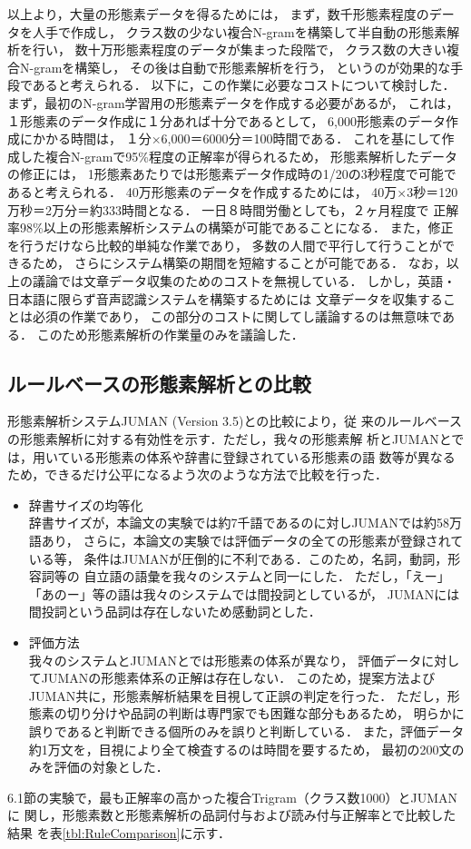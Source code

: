 以上より，大量の形態素データを得るためには，
まず，数千形態素程度のデータを人手で作成し，
クラス数の少ない複合N-gramを構築して半自動の形態素解析を行い，
数十万形態素程度のデータが集まった段階で，
クラス数の大きい複合N-gramを構築し，
その後は自動で形態素解析を行う，
というのが効果的な手段であると考えられる．
以下に，この作業に必要なコストについて検討した．
まず，最初のN-gram学習用の形態素データを作成する必要があるが，
これは，１形態素のデータ作成に１分あれば十分であるとして，
6,000形態素のデータ作成にかかる時間は，
１分×6,000＝6000分＝100時間である．
これを基にして作成した複合N-gramで95\%程度の正解率が得られるため，
形態素解析したデータの修正には，
1形態素あたりでは形態素データ作成時の1/20の3秒程度で可能であると考えられる．
40万形態素のデータを作成するためには，
40万×3秒＝120万秒＝2万分＝約333時間となる．
一日８時間労働としても，２ヶ月程度で
正解率98\%以上の形態素解析システムの構築が可能であることになる．
また，修正を行うだけなら比較的単純な作業であり，
多数の人間で平行して行うことができるため，
さらにシステム構築の期間を短縮することが可能である．
なお，以上の議論では文章データ収集のためのコストを無視している．
しかし，英語・日本語に限らず音声認識システムを構築するためには
文章データを収集することは必須の作業であり，
この部分のコストに関してし議論するのは無意味である．
このため形態素解析の作業量のみを議論した．



\subsection{ルールベースの形態素解析との比較}

形態素解析システムJUMAN \cite{Kurohashi} (Version 3.5)との比較により，従
来のルールベースの形態素解析に対する有効性を示す．ただし，我々の形態素解
析とJUMANとでは，用いている形態素の体系や辞書に登録されている形態素の語
数等が異なるため，できるだけ公平になるよう次のような方法で比較を行った．

\begin{itemize}
\item 辞書サイズの均等化 \\
辞書サイズが，本論文の実験では約7千語であるのに対しJUMANでは約58万語あり，
さらに，本論文の実験では評価データの全ての形態素が登録されている等，
条件はJUMANが圧倒的に不利である．このため，名詞，動詞，形容詞等の
自立語の語彙を我々のシステムと同一にした．
ただし，「えー」「あのー」等の語は我々のシステムでは間投詞としているが，
JUMANには間投詞という品詞は存在しないため感動詞とした．
\item 評価方法 \\
我々のシステムとJUMANとでは形態素の体系が異なり，
評価データに対してJUMANの形態素体系の正解は存在しない．
このため，提案方法よびJUMAN共に，形態素解析結果を目視して正誤の判定を行った．
ただし，形態素の切り分けや品詞の判断は専門家でも困難な部分もあるため，
明らかに誤りであると判断できる個所のみを誤りと判断している．
また，評価データ約1万文を，目視により全て検査するのは時間を要するため，
最初の200文のみを評価の対象とした．
\end{itemize}
6.1節の実験で，最も正解率の高かった複合Trigram（クラス数1000）とJUMANに
関し，形態素数と形態素解析の品詞付与および読み付与正解率とで比較した結果
を表\ref{tbl:RuleComparison}に示す．


